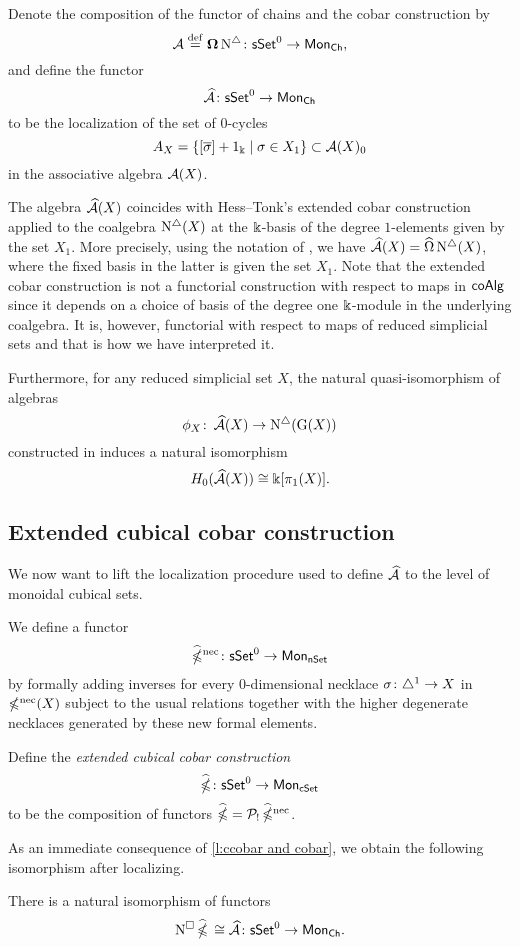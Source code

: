 Denote the composition of the functor of chains and the cobar construction by
\[
\operatorname{\mathcal{A}} \stackrel{\mathrm{def}}{=} \operatorname{\mathbf{\Omega}} \operatorname{N^{\triangle}} \colon \mathsf{sSet}^0 \to \mathsf{Mon}_{\mathsf{Ch}},
\]
and define the functor
\[
\operatorname{\mathcal{\widehat{A}}} \colon \mathsf{sSet}^0 \to \mathsf{Mon}_{\mathsf{Ch}}
\]
to be the localization of the set of $0$-cycles
\[
A_X = \{ [\overline{\sigma}]+1_\Bbbk \mid \sigma \in X_1 \} \subset \operatorname{\mathcal{A}}(X)_0
\]
in the associative algebra $\operatorname{\mathcal{A}}(X)$.

The algebra $\operatorname{\mathcal{\widehat{A}}}(X)$ coincides with Hess--Tonk's extended cobar construction applied to the coalgebra $\operatorname{N^{\triangle}}(X)$ at the $\Bbbk$-basis of the degree $1$-elements given by the set $X_1$.
More precisely, using the notation of \cite{hess2010cobar}, we have $\operatorname{\mathcal{\widehat{A}}}(X) = \widehat{\Omega} \operatorname{N^{\triangle}}(X)$, where the fixed basis in the latter is given the set $X_1$.
Note that the extended cobar construction is not a functorial construction with respect to maps in $\mathsf{coAlg}$ since it depends on a choice of basis of the degree one $\Bbbk$-module in the underlying coalgebra.
It is, however, functorial with respect to maps of reduced simplicial sets and that is how we have interpreted it.

Furthermore, for any reduced simplicial set $X$, the natural quasi-isomorphism of algebras
\[
\phi_X \colon \operatorname{\mathcal{\widehat{A}}}(X) \to \operatorname{N^{\triangle}}(\operatorname{G}(X))
\]
constructed in \cite{hess2010cobar} induces a natural isomorphism
\[
H_0(\operatorname{\mathcal{\widehat{A}}}(X)) \cong \Bbbk[\pi_1(X)].
\]

\subsection{Extended cubical cobar construction} \label{ss:extended cubical cobar}

We now want to lift the localization procedure used to define $\operatorname{\mathcal{\widehat{A}}}$ to the level of monoidal cubical sets.

We define a functor
\[
\operatorname{\widehat{\mathbb{\Omega}}^{\mathrm{nec}}} \colon \mathsf{sSet}^0 \to \mathsf{Mon}_{\mathsf{nSet}}
\]
by formally adding inverses for every $0$-dimensional necklace $\sigma \colon \triangle^1 \to X$ in $\operatorname{\mathbb{\Omega}^{\mathrm{nec}}}(X)$ subject to the usual relations together with the higher degenerate necklaces generated by these new formal elements.

Define the \textit{extended cubical cobar construction}
\[
\operatorname{\widehat{\mathbb{\Omega}}} \colon \mathsf{sSet}^0 \to \mathsf{Mon}_{\mathsf{cSet}}
\]
to be the composition of functors $\operatorname{\widehat{\mathbb{\Omega}}} = \mathcal{P}_{!} \operatorname{\widehat{\mathbb{\Omega}}^{\mathrm{nec}}}$.

As an immediate consequence of \cref{l:ccobar and cobar}, we obtain the following isomorphism after localizing.

\begin{corollary}
	There is a natural isomorphism of functors
	\[
	\operatorname{N^{\square}} \operatorname{\widehat{\mathbb{\Omega}}} \, \cong \operatorname{\mathcal{\widehat{A}}} \colon \mathsf{sSet}^0 \to \mathsf{Mon}_{\mathsf{Ch}}.
	\]
\end{corollary}

